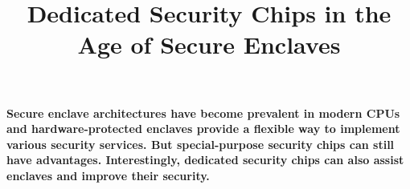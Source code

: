 

\graphicspath{{images/}}

\title{Dedicated Security Chips in the Age of Secure Enclaves} 


\maketitle
\thispagestyle{empty}

{\bfseries
Secure enclave architectures have become prevalent in modern CPUs and hardware-protected enclaves provide a flexible way to implement various security services. But special-purpose security chips can still have advantages. Interestingly, dedicated security chips can also assist enclaves and improve their security.}








{\small
%

}


